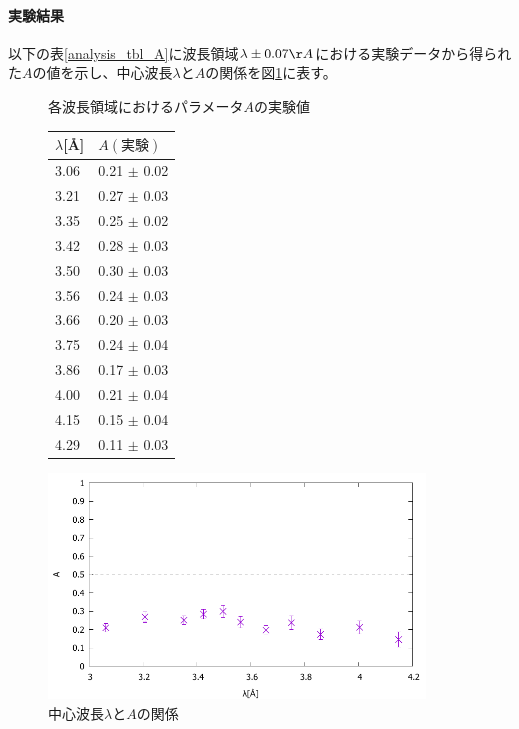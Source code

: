 \paragraph{実験結果}
以下の表\ref{analysis_tbl_A}に波長領域$\lambda \pm 0.07 \AA$における実験データから得られた$A$の値を示し、中心波長$\lambda$と$A$の関係を図\ref{analysis_fig_A}に表す。
\begin{figure}[H]
\begin{minipage}{0.35\hsize}
\centering
\makeatletter
\def\@captype{table}
\makeatother
\caption{各波長領域におけるパラメータ$A$の実験値} \label{analysis_tbl_A}
\begin{tabular}{ll}
$\lambda$[\AA] &  $A(実験)$\\ \hline
3.06 	&	0.21 	$\pm$	0.02 	\\
3.21 	&	0.27 	$\pm$	0.03 	\\
3.35 	&	0.25 	$\pm$	0.02 	\\
3.42 	&	0.28 	$\pm$	0.03 	\\
3.50 	&	0.30 	$\pm$	0.03 	\\
3.56 	&	0.24 	$\pm$	0.03 	\\
3.66 	&	0.20 	$\pm$	0.03 	\\
3.75 	&	0.24 	$\pm$	0.04 	\\
3.86 	&	0.17 	$\pm$	0.03 	\\
4.00 	&	0.21 	$\pm$	0.04 	\\
4.15 	&	0.15 	$\pm$	0.04 	\\
4.29 	&	0.11 	$\pm$	0.03 	\\ \hline
\end{tabular}
\end{minipage}
\begin{minipage}{0.65\hsize}
\centering
\vspace{2.5cm}
\includegraphics[width=10cm]{analysis/A/A_F.pdf}
\caption{中心波長$\lambda$と$A$の関係} \label{analysis_fig_A}
\end{minipage}
\end{figure}

